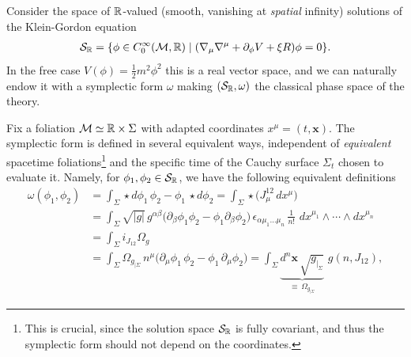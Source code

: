 \documentclass[../QFT_main.tex]{subfiles}
\begin{document}
\begin{mytheorem}
%
Consider the space of $\mathbb{R}$-valued (smooth, vanishing at \emph{spatial} infinity) solutions of the Klein-Gordon equation
\begin{align}\label{eq:real_space_KG_solutions}
    \mathcal{S}_{\mathbb{R}} = \{ \phi \in C^\infty_0(\mathcal{M},\mathbb{R}) \mid (\nabla_\mu \nabla^\mu + \partial_\phi V + \xi R) \phi = 0 \}.
\end{align}
In the free case $V(\phi) = \frac{1}{2} m^2 \phi^2$ this is a real vector space, and we can naturally endow it with a symplectic form $\omega$ making $(\mathcal{S}_{\mathbb{R}}, \omega)$ the classical phase space of the theory.


Fix a foliation $\mathcal{M}\simeq \mathbb{R}\times \Sigma$ with adapted coordinates $x^\mu=(t,\mathbf{x})$.
The symplectic form is defined in several equivalent ways, independent of \emph{equivalent} spacetime foliations\footnote{This is crucial, since the solution space $\mathcal{S}_{\mathbb{R}}$ is fully covariant, and thus the symplectic form should not depend on the coordinates.} and the specific time of the Cauchy surface $\Sigma_t$ chosen to evaluate it.
Namely, for $\phi_1, \phi_2 \in \mathcal{S}_{\mathbb{R}}$, we have the following equivalent definitions
\begin{align}
    \omega(\phi_1, \phi_2) &= \int_\Sigma \star d\phi_1 \, \phi_2 - \phi_1 \, \star d\phi_2
    =\int_\Sigma \star \big(J^{12}_\mu\, dx^\mu\big) \\
    &= \int_\Sigma \sqrt{|g|}\, g^{\alpha\beta}\Big(\partial_\beta \phi_1 \phi_2- \phi_1 \partial_\beta \phi_2\Big)\, \epsilon_{\alpha \mu_1\dots\mu_n}\,\frac{1}{n!}\,\, dx^{\mu_1}\wedge \cdots \wedge dx^{\mu_n} \\
    &= \int_\Sigma i_{J_{{12}}}\Omega_g\\
    &= \int_\Sigma \Omega_{g_{|\Sigma}}\, n^\mu \Big(\partial_\mu \phi_1 \,\phi_2- \phi_1 \,\partial_\mu \phi_2\Big) = \int_\Sigma \underbrace{d^n\mathbf{x}\,\sqrt{g_{|_\Sigma}}}_{\equiv \,\Omega_{g_{|\Sigma}}}\,\, g(n, J_{{12}}),
\end{align}
\vspace{-4mm}


\end{mytheorem}
\end{document}
